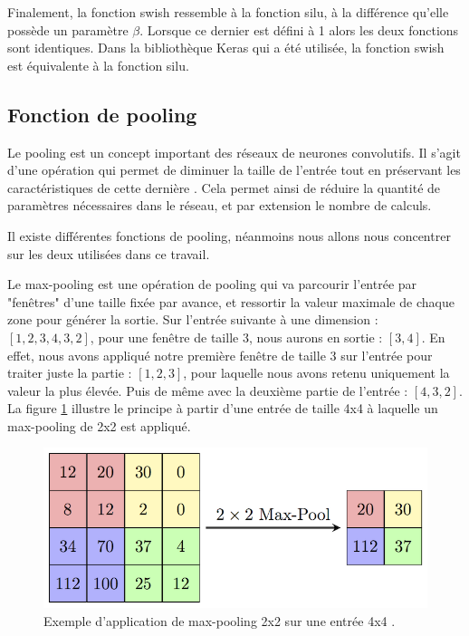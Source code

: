 Finalement, la fonction swish ressemble à la fonction \acrshort{silu}, à la différence qu'elle possède un paramètre $\beta$. Lorsque ce dernier est défini à 1 alors les deux fonctions sont identiques. Dans la bibliothèque Keras qui a été utilisée, la fonction swish est équivalente à la fonction \acrshort{silu}.
\newpage

\subsection{Fonction de pooling}

Le pooling est un concept important des réseaux de neurones convolutifs. Il s'agit d'une opération qui permet de diminuer la taille de l'entrée tout en préservant les caractéristiques de cette dernière \cite{fleuret_deep_nodate}. Cela permet ainsi de réduire la quantité de paramètres nécessaires dans le réseau, et par extension le nombre de calculs.

Il existe différentes fonctions de pooling, néanmoins nous allons nous concentrer sur les deux utilisées dans ce travail.

Le max-pooling est une opération de pooling qui va parcourir l'entrée par "fenêtres" d'une taille fixée par avance, et ressortir la valeur maximale de chaque zone pour générer la sortie. Sur l'entrée suivante à une dimension : $[1,2,3,4,3,2]$, pour une fenêtre de taille 3, nous aurons en sortie : $[3,4]$. En effet, nous avons appliqué notre première fenêtre de taille 3 sur l'entrée pour traiter juste la partie : $[1,2,3]$, pour laquelle nous avons retenu uniquement la valeur la plus élevée. Puis de même avec la deuxième partie de l'entrée : $[4,3,2]$.  La figure \ref{fig:maxpool_example} illustre le principe à partir d'une entrée de taille 4x4 à laquelle un max-pooling de 2x2 est appliqué.

\begin{figure}[hbt!]
    \centering
    \includegraphics[scale=1.4]{Figures/maxpool_example.png}
    \caption{Exemple d'application de max-pooling 2x2 sur une entrée 4x4 \cite{noauthor_maxpoolsample2png_nodate}.}
    \label{fig:maxpool_example}
\end{figure}

